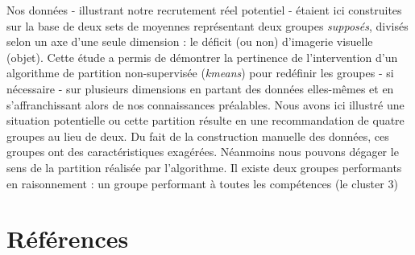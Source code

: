 \documentclass[
  12pt,
]{article}
\begin{document}
Nos données - illustrant notre recrutement réel potentiel - étaient ici
construites sur la base de deux sets de moyennes représentant deux
groupes \emph{supposés}, divisés selon un axe d'une seule dimension : le
déficit (ou non) d'imagerie visuelle (objet). Cette étude a permis de
démontrer la pertinence de l'intervention d'un algorithme de partition
non-supervisée (\emph{kmeans}) pour redéfinir les groupes - si
nécessaire - sur plusieurs dimensions en partant des données elles-mêmes
et en s'affranchissant alors de nos connaissances préalables. Nous avons
ici illustré une situation potentielle ou cette partition résulte en une
recommandation de quatre groupes au lieu de deux. Du fait de la
construction manuelle des données, ces groupes ont des caractéristiques
exagérées. Néanmoins nous pouvons dégager le sens de la partition
réalisée par l'algorithme. Il existe deux groupes performants en
raisonnement : un groupe performant à toutes les compétences (le cluster
3)

\newpage

\hypertarget{ruxe9fuxe9rences}{%
\section*{Références}\label{ruxe9fuxe9rences}}
\end{document}

